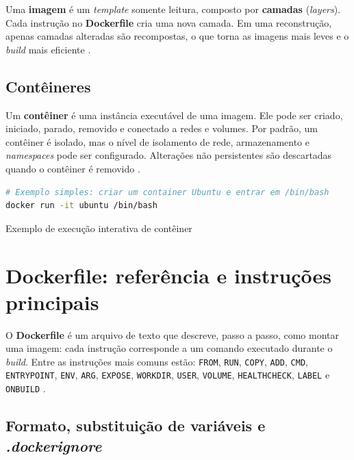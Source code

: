 Uma \textbf{imagem} é um \textit{template} somente leitura, composto por \textbf{camadas} (\textit{layers}). Cada instrução no \textbf{Dockerfile} cria uma nova camada. Em uma reconstrução, apenas camadas alteradas são recompostas, o que torna as imagens mais leves e o \textit{build} mais eficiente \cite{docker_overview}. 

\subsection{Contêineres}
\label{subsec:docker-containers}

Um \textbf{contêiner} é uma instância executável de uma imagem. Ele pode ser criado, iniciado, parado, removido e conectado a redes e volumes. Por padrão, um contêiner é isolado, mas o nível de isolamento de rede, armazenamento e \textit{namespaces} pode ser configurado. Alterações não persistentes são descartadas quando o contêiner é removido \cite{docker_overview}. 

\begin{codigo}[H]
\begin{lstlisting}[language=bash]
# Exemplo simples: criar um container Ubuntu e entrar em /bin/bash
docker run -it ubuntu /bin/bash
\end{lstlisting}
\caption{Exemplo de execução interativa de contêiner}
\label{lst:docker-run}
\end{codigo}

\section{Dockerfile: referência e instruções principais}
\label{sec:dockerfile}

O \textbf{Dockerfile} é um arquivo de texto que descreve, passo a passo, como montar uma imagem: cada instrução corresponde a um comando executado durante o \textit{build}. Entre as instruções mais comuns estão: \texttt{FROM}, \texttt{RUN}, \texttt{COPY}, \texttt{ADD}, \texttt{CMD}, \texttt{ENTRYPOINT}, \texttt{ENV}, \texttt{ARG}, \texttt{EXPOSE}, \texttt{WORKDIR}, \texttt{USER}, \texttt{VOLUME}, \texttt{HEALTHCHECK}, \texttt{LABEL} e \texttt{ONBUILD} \cite{dockerfile_ref}. 

\subsection{Formato, substituição de variáveis e \textit{.dockerignore}}
\label{subsec:dockerfile-format}

